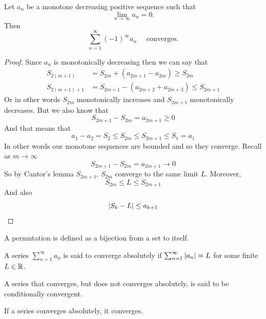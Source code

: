 \documentclass[11pt,a4paper]{article}
\begin{document}
	\newpage
	
  \begin{proposition}
    Let $a_n$ be a monotone decreasing positive sequence such that
    \[
      \lim_{n\to\infty} a_n = 0.
    \]
    Then
    \[
      \sum_{n=1}^{\infty}(-1)^{\infty}{a_n} \quad \text{ converges}.
    \]
  \end{proposition}
  \begin{proof}
    Since $a_n$ is monotonically decreasing then we can say that
    \begin{align*}
      S_{2(m+1)} &= S_{2m} + (a_{2m+1} - a_{2m}) \ge S_{2m} \\
      S_{2(m+1)+1} &= S_{2m + 1} - (a_{2m+2} + a_{2m+3}) \le S_{2m + 1}
    \end{align*}
    Or in other words $S_{2m}$ monotonically increases and 
    $S_{2m+1}$  monotonically decreases. 
    But we also know that
    \[
      S_{2m+1} - S_{2m} =  a_{2m + 1} \ge 0
    \]
    And that means that
    \[
      a_1 - a_2 = S_2 \le S_{2m} \le S_{2m+1} \le S_1 = a_1
    \]
    In other words our monotone sequences are bounded and so they converge. 
    Recall as $m\to\infty$
    \[
      S_{2m + 1} - S_{2m} =  a_{2m + 1} \to 0
    \]
    So by Cantor's lemma $S_{2m+1}$, $S_{2m}$ converge to the same limit $L$.
    Moreover,
    \[
      S_{2m} \le L \le S_{2m + 1}
    \]
    And also
    \[
      \left\lvert S_k - L\right\rvert \le a_{k + 1}
    \]
  \end{proof}
	
  \begin{definition}[Permutation]
    A permutation is defined as a bijection from a set to itself.
  \end{definition}

  \begin{definition}
    A series $\sum_{n=1}^{\infty} a_n$ is said to converge absolutely 
    if $\sum_{n=1}^{\infty} \left\lvert a_n\right\rvert = L$ for some finite $L \in \mathbb{R}$.
  \end{definition}
  \begin{remark}
    A series that converges, but does not converges absolutely, is said
    to be conditionally convergent.
  \end{remark}
  \begin{remark}
    If a series converges absolutely, it converges.
  \end{remark}
\end{document}
